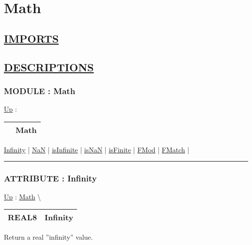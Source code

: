 \chapter*{Math}
\hypertarget{ecldoc:toc:Math}{}

\section*{\underline{IMPORTS}}

\section*{\underline{DESCRIPTIONS}}
\subsection*{MODULE : Math}
\hypertarget{ecldoc:Math}{}
\hyperlink{ecldoc:toc:root}{Up} :

{\renewcommand{\arraystretch}{1.5}
\begin{tabularx}{\textwidth}{|>{\raggedright\arraybackslash}l|X|}
\hline
\hspace{0pt} & Math \\
\hline
\end{tabularx}
}

\par


\hyperlink{ecldoc:math.infinity}{Infinity}  |
\hyperlink{ecldoc:math.nan}{NaN}  |
\hyperlink{ecldoc:math.isinfinite}{isInfinite}  |
\hyperlink{ecldoc:math.isnan}{isNaN}  |
\hyperlink{ecldoc:math.isfinite}{isFinite}  |
\hyperlink{ecldoc:math.fmod}{FMod}  |
\hyperlink{ecldoc:math.fmatch}{FMatch}  |

\rule{\linewidth}{0.5pt}

\subsection*{ATTRIBUTE : Infinity}
\hypertarget{ecldoc:math.infinity}{}
\hyperlink{ecldoc:Math}{Up} :
\hspace{0pt} \hyperlink{ecldoc:Math}{Math} \textbackslash 

{\renewcommand{\arraystretch}{1.5}
\begin{tabularx}{\textwidth}{|>{\raggedright\arraybackslash}l|X|}
\hline
\hspace{0pt}REAL8 & Infinity \\
\hline
\end{tabularx}
}

\par
Return a real ''infinity'' value.


